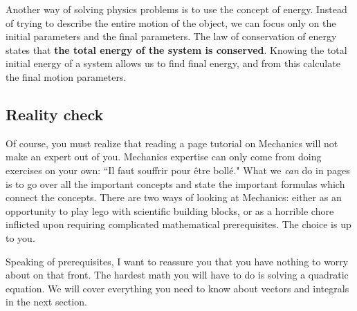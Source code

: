 Another way of solving physics problems is to use the concept of energy.
Instead of trying to describe the entire motion of the object, 
we can focus only on the initial parameters and the final parameters.
The law of conservation of energy states that {\bf the total energy of the system is conserved}.
Knowing the total initial energy of a system allows us to find final energy,
and from this calculate the final motion parameters.

\vspace{-3mm}
\subsection{Reality check}

Of course, you must realize that reading a \fourrr page tutorial on Mechanics will not make an expert out of you.
Mechanics expertise can only come from doing exercises on your own:
``Il faut souffrir pour \^etre boll\'e."
What we \emph{can} do in \fourrr pages is to go over all the important 
concepts and state the important formulas which connect the concepts.
%
There are two ways of looking at Mechanics: either as an opportunity to play {\sc lego} with scientific building blocks,
or as a horrible chore inflicted upon requiring complicated mathematical prerequisites.
The choice is up to you.

Speaking of prerequisites, I want to reassure you that you 
have nothing to worry about on that front.
The hardest math you will have to do is solving a quadratic equation.
We will cover everything you need to know about vectors and integrals
in the next section.

